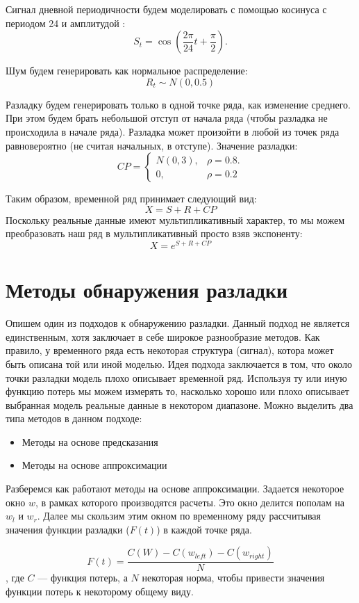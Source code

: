 \documentclass[%
12pt,
master,  %
natbib,      %
subf,        %
substylefile = spbu.rtx,
href,        %
colorlinks,  %
]{disser}
\begin{document}
Сигнал дневной периодичности будем моделировать с помощью косинуса с периодом 24 и амплитудой :
$$ S_t = \cos(\frac{2\pi}{24} t + \frac{\pi}{2}). $$

Шум будем генерировать как нормальное распределение:
$$ R_t \sim N(0, 0.5)  $$

Разладку будем генерировать только в одной точке ряда, как изменение среднего. При этом будем брать небольшой отступ от начала ряда (чтобы разладка не происходила в начале ряда). Разладка может произойти в любой из точек ряда равновероятно (не считая начальных, в отступе). Значение разладки:
$$   CP =
	\begin{cases}
    		N(0,3), & \rho = 0.8.\\
  		0, & \rho = 0.2
  \end{cases} $$

Таким образом, временной ряд принимает следующий вид:
$$ X = S + R + CP $$
Поскольку реальные данные имеют мультипликативный характер, то мы можем преобразовать наш ряд в мультипликативный просто взяв экспоненту:
$$ X = e^{S + R +CP} $$

\section{Методы обнаружения разладки}

Опишем один из подходов к обнаружению разладки. Данный подход не является единственным, хотя заключает в себе широкое разнообразие методов. Как правило, у временного ряда есть некоторая структура (сигнал), котора может быть описана той или иной моделью. Идея подхода заключается в том, что около точки разладки модель плохо описывает временной ряд. Используя ту или иную функцию потерь мы можем измерять то, насколько хорошо или плохо описывает выбранная модель реальные данные в некотором диапазоне.
Можно выделить два типа методов в данном подходе:
\begin{itemize}
	\item Методы на основе предсказания
	\item Методы на основе аппроксимации
\end{itemize}

Разберемся как работают методы на основе аппроксимации.
Задается некоторое окно $ w $, в рамках которого производятся расчеты. Это окно делится пополам на $w_{l} $ и $ w_{r} $. Далее мы скользим этим окном по временному ряду рассчитывая значения функции разладки ($F(t)$) в каждой точке ряда.

$$ F(t) = \frac{C(W) - C(w_{left}) - C(w_{right})}{N} $$
, где $C $ --- функция потерь, а $ N $ некоторая норма, чтобы привести значения функции потерь к некоторому общему виду.
\end{document}
